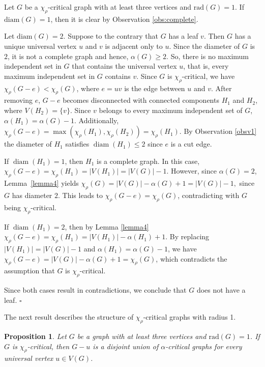 \documentclass[12pt]{article}
\newtheorem{proposition}[theorem]{Proposition}
\newcommand{\proof}{\noindent{\bf Proof.\ }}
\newcommand{\qed}{\hfill $\square$ \bigskip}
\newcommand{\ie}{that is}
\begin{document}
\proof Let $G$ be a $\chi_\rho$-critical graph with at least three vertices and $\mathrm{rad}(G) = 1$.  If $\mathrm{diam}(G) = 1$, then it is clear by Observation \ref{obs:complete}.

Let $\mathrm{diam}(G) = 2$.  Suppose to the contrary that $G$ has a leaf $v$. Then $G$ has a unique universal vertex $u$ and $v$ is adjacent only to $u$. Since the diameter of $G$ is $2$, it is not a complete graph and hence, $\alpha(G) \geq 2$. So, there is no maximum independent set in $G$ that contains the universal vertex $u$, \ie, every maximum independent set in $G$ contains $v$. Since $G$ is $\chi_\rho$-critical, we have $\chi_\rho(G-e)<\chi_\rho(G)$, where $e=u v$ is the edge between $u$ and $v$. After removing $e$, $G-e$ becomes disconnected with connected components $H_1$ and $H_2$, where $V\left(H_2\right)=\{v\}$. Since $v$  belongs to every maximum independent set of $G$, $\alpha\left(H_1\right)=\alpha(G)-1$.
Additionally, 
$\chi_\rho(G-e)=\max \left(\chi_\rho\left(H_1\right), \chi_\rho\left(H_2\right)\right)=\chi_\rho\left(H_1\right).$
 By Observation \ref{obsv1} the diameter of $H_1$ satisfies $\operatorname{diam}\left(H_1\right) \leq 2$ since $e$ is a cut edge.

If $\operatorname{diam}\left(H_1\right)=1$, then $H_1$ is a complete graph. In this case,
$\chi_\rho(G-e)=\chi_\rho\left(H_1\right)=|V(H_1)|=|V(G)|-1.$
However, since $\alpha(G) = 2$, Lemma~\ref{lemma4} yields 
$\chi_\rho(G) = |V(G)| - \alpha(G) + 1 = |V(G)| - 1,$ since $G$ has diameter $2$.
This leads to $\chi_\rho(G-e)=\chi_\rho(G)$, contradicting with $G$ being  $\chi_\rho$-critical.

 If $\operatorname{diam}\left(H_1\right)=2$, then by Lemma \ref{lemma4} 
$\chi_\rho(G-e)=\chi_\rho\left(H_1\right)=\left|V\left(H_1\right)\right|-\alpha\left(H_1\right)+1.$
By replacing $\left|V\left(H_1\right)\right|=|V(G)|-1$ and 
$\alpha\left(H_1\right)=\alpha(G)-1$, we have
$\chi_\rho(G-e)=|V(G)|-\alpha(G)+1=\chi_\rho(G)$, which contradicts the assumption that $G$ is $\chi_\rho$-critical.

Since both cases result in contradictions, we conclude that $G$ does not have a leaf. \qed

The next result describes the structure of $\chi_\rho$-critical graphs with radius 1.

\begin{proposition}\label{cor1}
Let $G$ be a graph with at least three vertices and $\mathrm{rad}(G) = 1$. If $G$ is $\chi_\rho$-critical, then $G-u$ is a disjoint union of $\alpha$-critical graphs for every universal vertex $u \in V(G)$. 
\end{proposition}
\end{document}
